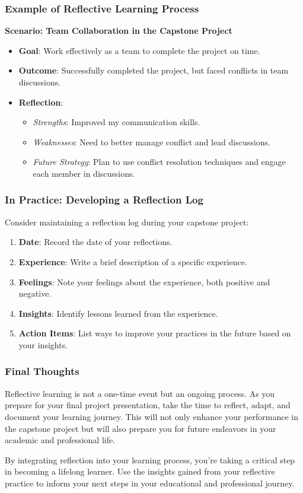 \documentclass[aspectratio=169]{beamer}
\begin{document}
\begin{frame}[fragile]
    \frametitle{Example of Reflective Learning Process}
    \textbf{Scenario: Team Collaboration in the Capstone Project}
    \begin{itemize}
        \item \textbf{Goal}: Work effectively as a team to complete the project on time.
        \item \textbf{Outcome}: Successfully completed the project, but faced conflicts in team discussions.
        \item \textbf{Reflection}:
            \begin{itemize}
                \item \textit{Strengths}: Improved my communication skills.
                \item \textit{Weaknesses}: Need to better manage conflict and lead discussions.
                \item \textit{Future Strategy}: Plan to use conflict resolution techniques and engage each member in discussions.
            \end{itemize}
    \end{itemize}
\end{frame}

\begin{frame}[fragile]
    \frametitle{In Practice: Developing a Reflection Log}
    Consider maintaining a reflection log during your capstone project:
    \begin{enumerate}
        \item \textbf{Date}: Record the date of your reflections.
        \item \textbf{Experience}: Write a brief description of a specific experience.
        \item \textbf{Feelings}: Note your feelings about the experience, both positive and negative.
        \item \textbf{Insights}: Identify lessons learned from the experience.
        \item \textbf{Action Items}: List ways to improve your practices in the future based on your insights.
    \end{enumerate}
\end{frame}

\begin{frame}[fragile]
    \frametitle{Final Thoughts}
    Reflective learning is not a one-time event but an ongoing process. As you prepare for your final project presentation, take the time to reflect, adapt, and document your learning journey. This will not only enhance your performance in the capstone project but will also prepare you for future endeavors in your academic and professional life.
    
    By integrating reflection into your learning process, you’re taking a critical step in becoming a lifelong learner. Use the insights gained from your reflective practice to inform your next steps in your educational and professional journey.
\end{frame}
\end{document}
